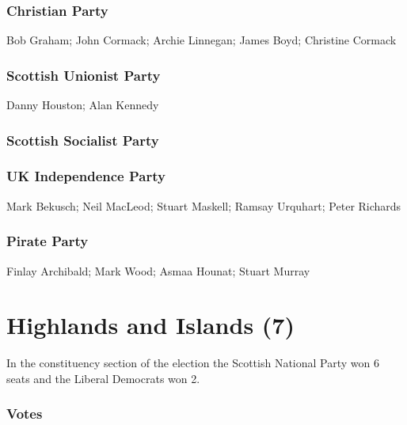 \begin{resultsiii}
\subsubsection*{Christian Party}
Bob Graham; John Cormack; Archie Linnegan; James Boyd; Christine Cormack
\subsubsection*{Scottish Unionist Party}
Danny Houston; Alan Kennedy
\subsubsection*{Scottish Socialist Party}
\subsubsection*{UK Independence Party}
Mark Bekusch; Neil MacLeod; Stuart Maskell; Ramsay Urquhart; Peter Richards
\subsubsection*{Pirate Party}
Finlay Archibald; Mark Wood; Asmaa Hounat; Stuart Murray
\end{resultsiii}

\vfill

\section[Highlands and Islands]{Highlands and Islands (7)}

In the constituency section of the election the Scottish National Party won 6 seats and the Liberal Democrats won 2.

\subsubsection*{Votes}

